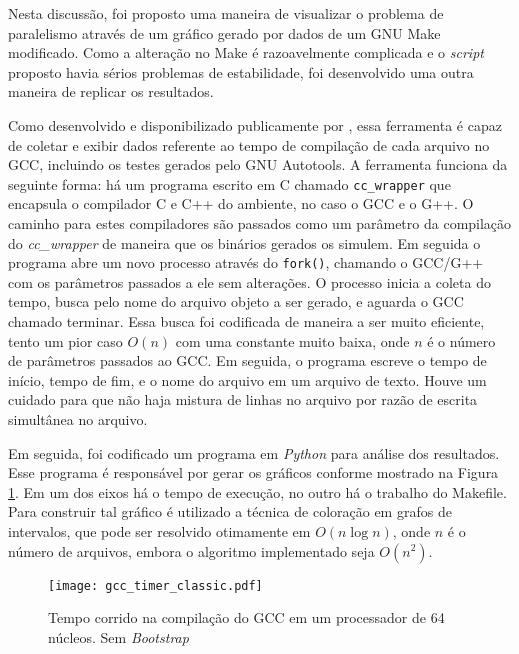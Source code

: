 Nesta discussão, foi proposto uma maneira de visualizar o problema de
paralelismo através de um gráfico gerado por dados de um GNU Make modificado.
Como a alteração no Make é razoavelmente complicada e o \textit{script} proposto
havia sérios problemas de estabilidade, foi desenvolvido uma outra maneira
de replicar os resultados.

Como desenvolvido e disponibilizado publicamente por \cite{gcctimer}, essa
ferramenta é capaz de coletar e exibir dados referente ao tempo de compilação
de cada arquivo no GCC, incluindo os testes gerados pelo GNU Autotools.
A ferramenta funciona da seguinte forma: há um programa escrito em C chamado
\texttt{cc\_wrapper} que encapsula o compilador C e C++ do ambiente, no caso o 
GCC e o G++. O caminho para estes compiladores são passados como um parâmetro
da compilação do \textit{cc\_wrapper} de maneira que os binários gerados os
simulem. Em seguida o programa abre um novo processo através do \texttt{fork()},
chamando o GCC/G++ com os parâmetros passados a ele sem alterações. O processo
inicia a coleta do tempo, busca pelo nome do arquivo objeto a ser gerado, e
aguarda o GCC chamado terminar. Essa busca foi codificada de maneira a ser
muito eficiente, tento um pior caso $O(n)$ com uma constante muito baixa,
onde $n$ é o número de parâmetros passados ao GCC. Em seguida, o programa
escreve o tempo de início, tempo de fim, e o nome do arquivo em um arquivo
de texto. Houve um cuidado para que não haja mistura de linhas
no arquivo por razão de escrita simultânea no arquivo.

Em seguida, foi codificado um programa em \textit{Python} para análise dos
resultados. Esse programa é responsável por gerar os gráficos conforme
mostrado na Figura \ref{fig:analysis_classical}. Em um dos eixos há o 
tempo de execução, no outro há
o trabalho do Makefile. Para construir tal gráfico é utilizado a técnica
de coloração em grafos de intervalos, que pode ser resolvido otimamente
em $O(n \log n)$, onde $n$ é o número de arquivos, embora o algoritmo
implementado seja $O(n^2)$.


\begin{figure}[ht]
 \centering
 \texttt{[image: gcc\_timer\_classic.pdf]}
 \caption{Tempo corrido na compilação do GCC em um processador de 64 núcleos. Sem \textit{Bootstrap}}
 \label{fig:analysis_classical}
\end{figure}


